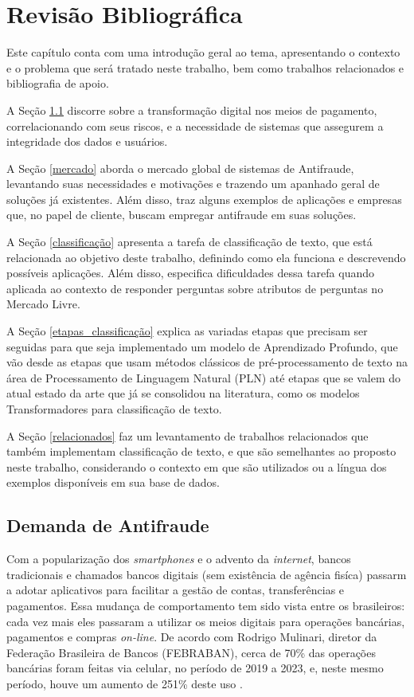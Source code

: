 \chapter{Revisão Bibliográfica}
\label{cap-revisao-bibliografica}
Este capítulo conta com uma introdução geral ao tema, apresentando o contexto e o problema que será tratado neste trabalho, bem como trabalhos relacionados e bibliografia de apoio.

A Seção \ref{demanda} discorre sobre a transformação digital nos meios de pagamento, correlacionando com seus riscos, e a necessidade de sistemas que assegurem a integridade dos dados e usuários.

A Seção \ref{mercado} aborda o mercado global de sistemas de Antifraude, levantando suas necessidades e motivações e trazendo um apanhado geral de soluções já existentes. Além disso, traz alguns exemplos de aplicações e empresas que, no papel de cliente, buscam empregar antifraude em suas soluções.

A Seção \ref{classificação} apresenta a tarefa de classificação de texto, que está relacionada ao objetivo deste trabalho, definindo como ela funciona e descrevendo possíveis aplicações. Além disso, especifica dificuldades dessa tarefa quando aplicada ao contexto de responder perguntas sobre atributos de perguntas no Mercado Livre.

A Seção \ref{etapas_classificação} explica as variadas etapas que precisam ser seguidas para que seja implementado um modelo de Aprendizado Profundo, que vão desde as etapas que usam métodos clássicos de pré-processamento de texto na área de Processamento de Linguagem Natural (PLN) até etapas que se valem do atual estado da arte que já se consolidou na literatura, como os modelos Transformadores para classificação de texto.

A Seção \ref{relacionados} faz um levantamento de trabalhos relacionados que também implementam classificação de texto, e que são semelhantes ao proposto neste trabalho, considerando o contexto em que são utilizados ou a língua dos exemplos disponíveis em sua base de dados.

\section{Demanda de Antifraude}
\label{demanda}
Com a popularização dos \textit{smartphones} e o advento da \textit{internet}, bancos tradicionais e chamados bancos digitais (sem existência de agência fisíca) passarm a adotar aplicativos para facilitar a gestão de contas, transferências e pagamentos. Essa mudança de comportamento tem sido vista entre os brasileiros: cada vez mais eles passaram a utilizar os meios digitais para operações bancárias, pagamentos e compras \textit{on-line}. De acordo com Rodrigo Mulinari, diretor da Federação Brasileira de Bancos (FEBRABAN), cerca de 70\% das operações bancárias foram feitas via celular, no período de 2019 a 2023, e, neste mesmo período, houve um aumento de 251\% deste uso \cite{febraban2024}.

